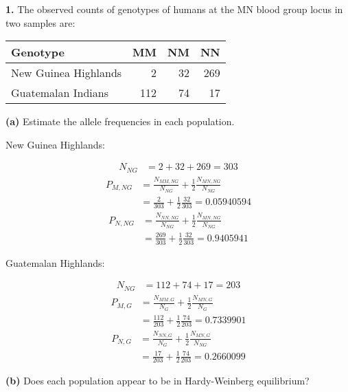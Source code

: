 \documentclass{essay}
\begin{document}
\sffamily


\begin{essaystyle}

\textbf{1.} The observed counts of genotypes of humans at the MN blood group
locus in two samples are:

\begin{tabular}{l | r r r}
Genotype             & MM  & NM & NN \\ \hline
New Guinea Highlands & 2   & 32 & 269  \\
Guatemalan Indians   & 112 & 74 & 17\\
\end{tabular}

\textbf{(a)} Estimate the allele frequencies in each population.

New Guinea Highlands:

\begin{align}
N_{NG} &= 2 + 32 + 269 = 303
\end{align}
\begin{align}
  P_{M,NG} &= \frac{N_{MM,NG}}{N_{NG}} + \frac{1}{2}\frac{N_{MN,NG}}{N_{NG}} \\
  &= \frac{2}{303} + \frac{1}{2}\frac{32}{303} = 0.05940594
\end{align}
\begin{align}
  P_{N,NG} &= \frac{N_{NN,NG}}{N_{NG}} + \frac{1}{2}\frac{N_{MN,NG}}{N_{NG}} \\
  &= \frac{269}{303} + \frac{1}{2}\frac{32}{303} = 0.9405941
\end{align}

Guatemalan Highlands:

\begin{align}
N_{NG} &= 112+74+17  = 203
\end{align}
\begin{align}
  P_{M,G} &= \frac{N_{MM,G}}{N_{G}} + \frac{1}{2}\frac{N_{MN,G}}{N_{G}} \\
  &= \frac{112}{203} + \frac{1}{2}\frac{74}{203} = 0.7339901
\end{align}
\begin{align}
  P_{N,G} &= \frac{N_{NN,G}}{N_{G}} + \frac{1}{2}\frac{N_{MN,G}}{N_{NG}} \\
  &= \frac{17}{203} + \frac{1}{2}\frac{74}{203} = 0.2660099
\end{align}


\textbf{(b)} Does each population appear to be in Hardy-Weinberg equilibrium?


\end{essaystyle}
\end{document}
